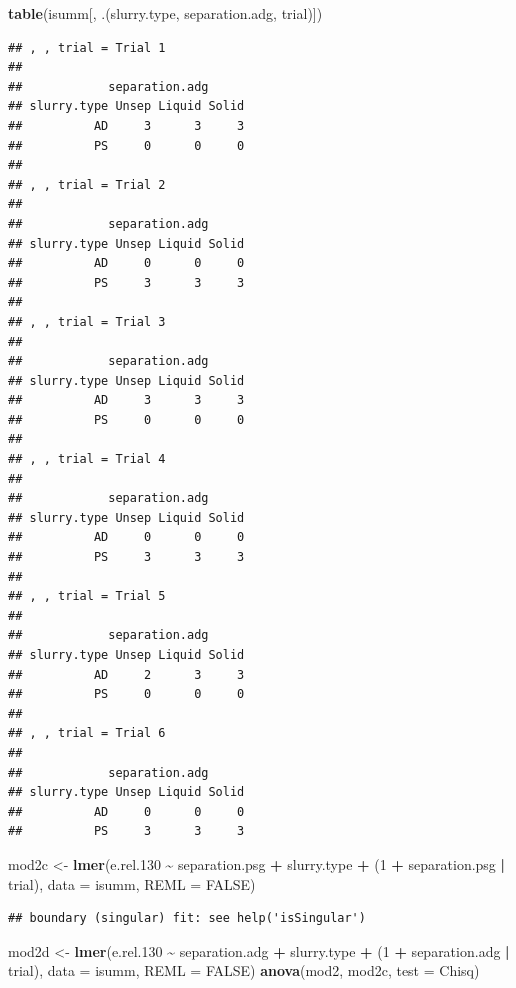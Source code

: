 \documentclass[
]{article}
\newenvironment{Shaded}{\begin{snugshade}}{\end{snugshade}}
\newcommand{\AttributeTok}[1]{\textcolor[rgb]{0.13,0.29,0.53}{#1}}
\newcommand{\ConstantTok}[1]{\textcolor[rgb]{0.56,0.35,0.01}{#1}}
\newcommand{\DecValTok}[1]{\textcolor[rgb]{0.00,0.00,0.81}{#1}}
\newcommand{\FloatTok}[1]{\textcolor[rgb]{0.00,0.00,0.81}{#1}}
\newcommand{\FunctionTok}[1]{\textcolor[rgb]{0.13,0.29,0.53}{\textbf{#1}}}
\newcommand{\NormalTok}[1]{#1}
\newcommand{\OtherTok}[1]{\textcolor[rgb]{0.56,0.35,0.01}{#1}}
\newcommand{\SpecialCharTok}[1]{\textcolor[rgb]{0.81,0.36,0.00}{\textbf{#1}}}
\newcommand{\StringTok}[1]{\textcolor[rgb]{0.31,0.60,0.02}{#1}}
\begin{document}
\begin{Shaded}
\begin{Highlighting}[]
\FunctionTok{table}\NormalTok{(isumm[, .(slurry.type, separation.adg, trial)])}
\end{Highlighting}
\end{Shaded}

\begin{verbatim}
## , , trial = Trial 1
## 
##            separation.adg
## slurry.type Unsep Liquid Solid
##          AD     3      3     3
##          PS     0      0     0
## 
## , , trial = Trial 2
## 
##            separation.adg
## slurry.type Unsep Liquid Solid
##          AD     0      0     0
##          PS     3      3     3
## 
## , , trial = Trial 3
## 
##            separation.adg
## slurry.type Unsep Liquid Solid
##          AD     3      3     3
##          PS     0      0     0
## 
## , , trial = Trial 4
## 
##            separation.adg
## slurry.type Unsep Liquid Solid
##          AD     0      0     0
##          PS     3      3     3
## 
## , , trial = Trial 5
## 
##            separation.adg
## slurry.type Unsep Liquid Solid
##          AD     2      3     3
##          PS     0      0     0
## 
## , , trial = Trial 6
## 
##            separation.adg
## slurry.type Unsep Liquid Solid
##          AD     0      0     0
##          PS     3      3     3
\end{verbatim}

\begin{Shaded}
\begin{Highlighting}[]
\NormalTok{mod2c }\OtherTok{\textless{}{-}} \FunctionTok{lmer}\NormalTok{(e.rel}\FloatTok{.130} \SpecialCharTok{\textasciitilde{}}\NormalTok{ separation.psg }\SpecialCharTok{+}\NormalTok{ slurry.type }\SpecialCharTok{+}\NormalTok{ (}\DecValTok{1} \SpecialCharTok{+}\NormalTok{ separation.psg }\SpecialCharTok{|}\NormalTok{ trial), }\AttributeTok{data =}\NormalTok{ isumm, }\AttributeTok{REML =} \ConstantTok{FALSE}\NormalTok{)}
\end{Highlighting}
\end{Shaded}

\begin{verbatim}
## boundary (singular) fit: see help('isSingular')
\end{verbatim}

\begin{Shaded}
\begin{Highlighting}[]
\NormalTok{mod2d }\OtherTok{\textless{}{-}} \FunctionTok{lmer}\NormalTok{(e.rel}\FloatTok{.130} \SpecialCharTok{\textasciitilde{}}\NormalTok{ separation.adg }\SpecialCharTok{+}\NormalTok{ slurry.type }\SpecialCharTok{+}\NormalTok{ (}\DecValTok{1} \SpecialCharTok{+}\NormalTok{ separation.adg }\SpecialCharTok{|}\NormalTok{ trial), }\AttributeTok{data =}\NormalTok{ isumm, }\AttributeTok{REML =} \ConstantTok{FALSE}\NormalTok{)}
\FunctionTok{anova}\NormalTok{(mod2, mod2c, }\AttributeTok{test =} \StringTok{\textquotesingle{}Chisq\textquotesingle{}}\NormalTok{)}
\end{Highlighting}
\end{Shaded}
\end{document}
